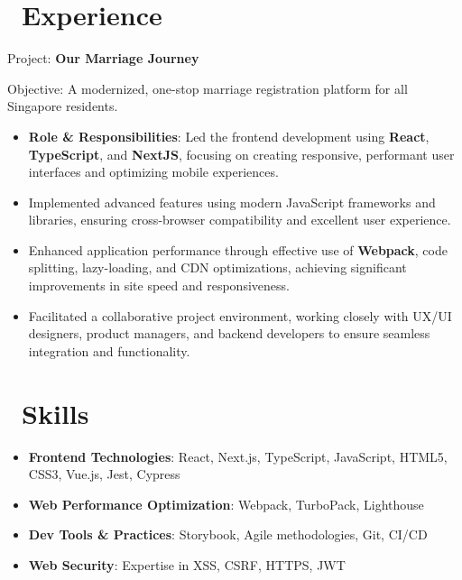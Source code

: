 \documentclass{resume}
\begin{document}
\onehalfspacing
{}



\section{\faUsers\ Experience}

Project: \textbf{Our Marriage Journey}

Objective: A modernized, one-stop marriage registration platform for all Singapore residents.
\begin{itemize}
  \item \textbf{Role \& Responsibilities}: Led the frontend development using \textbf{React}, \textbf{TypeScript}, and \textbf{NextJS}, focusing on creating responsive, performant user interfaces and optimizing mobile experiences.
  \item Implemented advanced features using modern JavaScript frameworks and libraries, ensuring cross-browser compatibility and excellent user experience.
  \item Enhanced application performance through effective use of \textbf{Webpack}, code splitting, lazy-loading, and CDN optimizations, achieving significant improvements in site speed and responsiveness.
  \item Facilitated a collaborative project environment, working closely with UX/UI designers, product managers, and backend developers to ensure seamless integration and functionality.
\end{itemize}

\section{\faCogs\ Skills}
\begin{itemize}[parsep=0.5ex]
  \item \textbf{Frontend Technologies}: React, Next.js, TypeScript, JavaScript, HTML5, CSS3, Vue.js, Jest, Cypress
  \item \textbf{Web Performance Optimization}: Webpack, TurboPack, Lighthouse
  \item \textbf{Dev Tools \& Practices}: Storybook, Agile methodologies, Git, CI/CD
  \item \textbf{Web Security}: Expertise in XSS, CSRF, HTTPS, JWT
\end{itemize}
\end{document}

